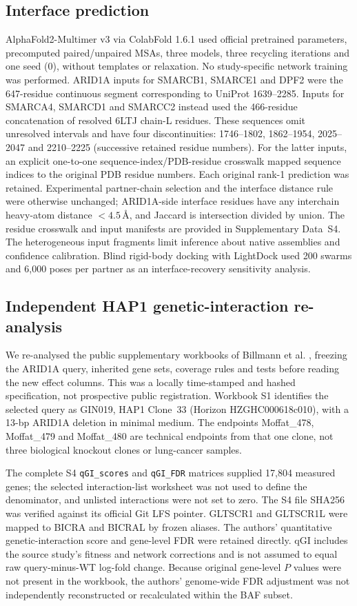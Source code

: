 \documentclass[11pt,letterpaper]{article}
\begin{document}
\subsection*{Interface prediction}
AlphaFold2-Multimer v3 via ColabFold 1.6.1
\citep{jumper2021,evans2024,mirdita2022} used official pretrained parameters,
precomputed paired/unpaired MSAs, three models, three recycling iterations and
one seed (0), without templates or relaxation. No study-specific network
training was performed. ARID1A inputs for
SMARCB1, SMARCE1 and DPF2 were the 647-residue continuous segment corresponding
to UniProt 1639--2285. Inputs for SMARCA4, SMARCD1 and SMARCC2 instead used
the 466-residue concatenation of resolved 6LTJ chain-L residues. These sequences
omit unresolved intervals and have four discontinuities: 1746--1802,
1862--1954, 2025--2047 and 2210--2225 (successive retained residue numbers).
For the latter inputs, an explicit one-to-one sequence-index/PDB-residue
crosswalk mapped sequence indices to the original PDB residue numbers. Each original rank-1 prediction
was retained. Experimental partner-chain selection and the interface distance
rule were otherwise unchanged; ARID1A-side interface residues have any interchain
heavy-atom distance $<4.5$\,\AA{}, and Jaccard is intersection divided by union.
The residue crosswalk and input manifests are provided in Supplementary Data~S4. The heterogeneous input fragments limit inference about
native assemblies and confidence calibration.
Blind rigid-body docking with LightDock \citep{jimenez2018} used 200 swarms and
6{,}000 poses per partner as an interface-recovery sensitivity analysis.

\subsection*{Independent HAP1 genetic-interaction re-analysis}
We re-analysed the public supplementary workbooks of Billmann et al.
\citep{billmann2026}, freezing the ARID1A query, inherited gene sets, coverage
rules and tests before reading the new effect columns. This was a locally
time-stamped and hashed specification, not prospective public registration.
Workbook S1 identifies the selected query as GIN019, HAP1 Clone~33
(Horizon HZGHC000618c010), with a 13-bp ARID1A deletion in minimal medium.
The endpoints Moffat\_478, Moffat\_479 and Moffat\_480 are technical endpoints
from that one clone, not three biological knockout clones or lung-cancer
samples.

The complete S4 \texttt{qGI\_scores} and \texttt{qGI\_FDR} matrices supplied
17{,}804 measured genes; the selected interaction-list worksheet was not used
to define the denominator, and unlisted interactions were not set to zero.
The S4 file SHA256 was verified against its official Git LFS pointer.
GLTSCR1 and GLTSCR1L were mapped to BICRA and BICRAL by frozen aliases.
The authors' quantitative genetic-interaction score and gene-level FDR were
retained directly. qGI includes the source study's fitness and network
corrections and is not assumed to equal raw query-minus-WT log-fold change.
Because original gene-level $P$ values were not present in the workbook,
the authors' genome-wide FDR adjustment was not independently reconstructed
or recalculated within the BAF subset.
\end{document}
